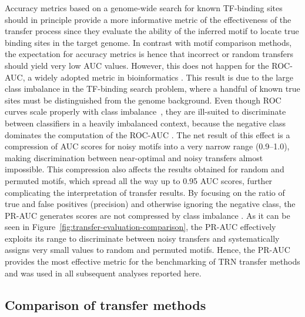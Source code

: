 Accuracy metrics based on a genome-wide search for known TF-binding sites
should in principle provide a more informative metric of the effectiveness of
the transfer process since they evaluate the ability of the inferred motif to
locate true binding sites in the target genome. In contrast with motif
comparison methods, the expectation for accuracy metrics is hence that
incorrect or random transfers should yield very low AUC values. However, this
does not happen for the ROC-AUC, a widely adopted metric in bioinformatics
\citep{saito2015precision}. This result is due to the large class imbalance in
the TF-binding search problem, where a handful of known true sites must be
distinguished from the genome background. Even though ROC curves scale properly
with class imbalance~\citep{fawcett2006introduction}, they are ill-suited to
discriminate between classifiers in a heavily imbalanced context, because the
negative class dominates the computation of the ROC-AUC
\citep{davis2006relationship}. The net result of this effect is a compression of
AUC scores for noisy motifs into a very narrow range (0.9--1.0), making
discrimination between near-optimal and noisy transfers almost impossible. This
compression also affects the results obtained for random and permuted motifs,
which spread all the way up to 0.95 AUC scores, further complicating the
interpretation of transfer results. By focusing on the ratio of true and false
positives (precision) and otherwise ignoring the negative class, the PR-AUC
generates scores are not compressed by class imbalance
\citep{saito2015precision, davis2006relationship}. As it can be seen in
Figure~\ref{fig:transfer-evaluation-comparison}, the PR-AUC effectively
exploits its range to discriminate between noisy transfers and systematically
assigns very small values to random and permuted motifs. Hence, the PR-AUC
provides the most effective metric for the benchmarking of TRN transfer methods
and was used in all subsequent analyses reported here.

\subsection{Comparison of transfer methods}

